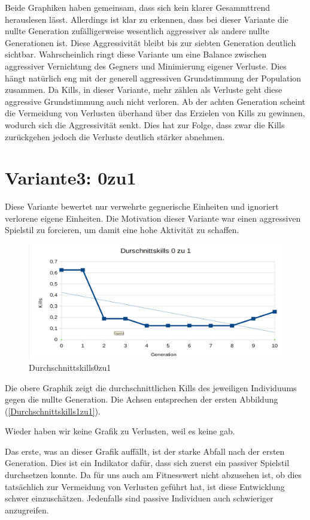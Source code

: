 \documentclass[
	12pt,
	a4paper,
	BCOR10mm,
	DIV14,
	headsepline,
	usegeometry,
]{scrreprt}
\begin{document}
Beide Graphiken haben gemeinsam, dass sich kein klarer Gesammttrend herauslesen lässt.
Allerdings ist klar zu erkennen, dass bei dieser Variante die nullte Generation zufälligerweise wesentlich aggressiver als andere nullte Generationen ist.
Diese Aggressivität bleibt bis zur siebten Generation deutlich sichtbar.
Wahrscheinlich ringt diese Variante um eine Balance zwischen aggressiver Vernichtung des Gegners und Minimierung eigener Verluste.
Dies hängt natürlich eng mit der generell aggressiven Grundstimmung der Population zusammen.
Da Kills, in dieser Variante, mehr zählen als Verluste geht diese aggressive Grundstimmung auch nicht verloren.
Ab der achten Generation scheint die Vermeidung von Verlusten überhand über das Erzielen von Kills zu gewinnen, wodurch sich die Aggressivität senkt.
Dies hat zur Folge, dass zwar die Kills zurückgehen jedoch die Verluste deutlich stärker abnehmen.

\section{Variante3: 0zu1}
Diese Variante bewertet nur verwehrte gegnerische Einheiten und ignoriert verlorene eigene Einheiten.
Die Motivation dieser Variante war einen aggressiven Spielstil zu forcieren, um damit eine hohe Aktivität zu schaffen.

\begin{figure}[h]
	\includegraphics[width = \textwidth]{Durchschnittskills0zu1.png}
	\caption{Durchschnittskills0zu1}
	\label{Durchschnittskills0zu1}
\end{figure}

Die obere Graphik zeigt die durchschnittlichen Kills des jeweiligen Individuums gegen die nullte Generation.
Die Achsen entsprechen der ersten Abbildung (\ref{Durchschnittskills1zu1}).

Wieder haben wir keine Grafik zu Verlusten, weil es keine gab.

Das erste, was an dieser Grafik auffällt, ist der starke Abfall nach der ersten Generation.
Dies ist ein Indikator dafür, dass sich zuerst ein passiver Spielstil durchsetzen konnte.
Da für uns auch am Fitnesswert nicht abzusehen ist, ob dies tatsächlich zur Vermeidung von Verlusten geführt hat, ist diese Entwicklung schwer einzuschätzen.
Jedenfalls sind passive Individuen auch schwieriger anzugreifen.
\end{document}
